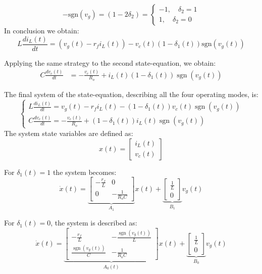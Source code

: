 \documentclass[DIV=calc, paper=a4, fontsize=11pt, twocolumn]{scrartcl}	 %
\begin{document}
\begin{equation}
	-\text{sgn}(v_g) = (1 - 2\delta_2) = 
\begin{cases}
    -1, \quad \delta_2 = 1 \\
     1, \quad \delta_2 = 0
\end{cases}
\end{equation}
In conclusion we obtain:
\begin{equation}
L \frac{di_L(t)}{dt} = (v_g(t) - r_f i_L(t)) - v_c(t) (1 - \delta_1(t)) \text{sgn}(v_g(t))
\end{equation}

Applying the same strategy to the second state-equation, we obtain:
\begin{equation}
\begin{aligned}
C \frac{dv_c(t)}{dt} &= -\frac{v_c(t)}{R_o} + i_L(t) (1 - \delta_1(t)) \operatorname{sgn}(v_g(t))
\end{aligned}
\end{equation}

The final system of the state-equation, describing  all the four operating modes, is:
{\small
\begin{equation}
\begin{cases} 
L \frac{di_L(t)}{dt} = v_g(t) - r_f i_L(t) - (1 - \delta_1(t)) v_c(t) \operatorname{sgn}(v_g(t)) \\ 
C \frac{dv_c(t)}{dt} = -\frac{v_c(t)}{R_o} + (1 - \delta_1(t)) i_L(t) \operatorname{sgn}(v_g(t)) 
\end{cases}
\end{equation}
}
The system state variables are defined as:
\begin{equation}
x(t) = \begin{bmatrix}i_L(t) \\ v_c(t) \end{bmatrix}
\end{equation}


For $\delta_1(t)=1$ the system becomes:
\begin{equation}
\dot{x}(t) = \underbrace{\begin{bmatrix} -\frac{r_f}{L} & 0 \\ 0 & -\frac{1}{R_o C} \end{bmatrix}}_{A_1} x(t) + \underbrace{\begin{bmatrix} \frac{1}{L} \\ 0 \end{bmatrix}}_{B_1} v_g(t)
\end{equation}

For $\delta_1(t)=0$, the system is described as:
\begin{equation}
\dot{x}(t) = \underbrace{\begin{bmatrix} 
-\frac{r_f}{L} & -\frac{\operatorname{sgn}(v_g(t))}{L} \\ 
\frac{\operatorname{sgn}(v_g(t))}{C} & -\frac{1}{R_o C} 
\end{bmatrix}}_{A_0(t)} x(t) + 
\underbrace{\begin{bmatrix} 
\frac{1}{L} \\ 
0 
\end{bmatrix}}_{B_0} v_g(t)
\end{equation}
\end{document}
